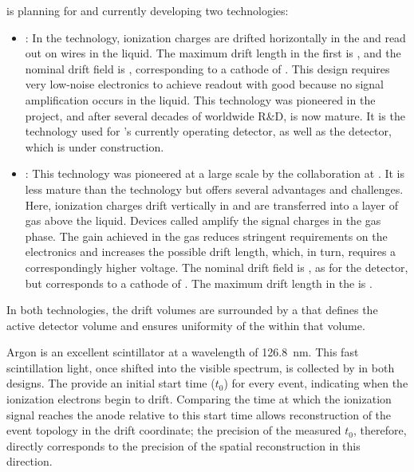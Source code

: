  is planning for and currently developing two  technologies:
\begin{itemize}
\item {}: In the  technology, ionization charges are drifted horizontally in the  and read out on wires in the liquid.  The maximum drift length in the first   is \spmaxdrift, and the nominal drift field is \spmaxfield, corresponding to a cathode  of \sptargetdriftvoltpos. This design requires very low-noise electronics to achieve readout with good  because no signal amplification occurs in the liquid. This technology was pioneered in the  project, and after several decades of worldwide R\&D, is now mature. It is the technology used for 's currently operating  detector, as well as the  detector, which is under construction. 

\item {}: This technology was pioneered at a large scale by the  collaboration at . It is less mature than the  technology but offers several advantages and challenges. Here, ionization charges drift vertically in  and are transferred into a layer of gas above the liquid. Devices called  amplify the signal charges  in the gas phase. The gain achieved in the gas reduces stringent requirements on the electronics and increases the possible drift length, which, in turn, requires a correspondingly higher voltage. The nominal drift field is \dpnominaldriftfield, as for the  detector, but corresponds to a cathode  of \dptargetdriftvoltpos.
The maximum drift length in the  is \dpmaxdrift{}.  
\end{itemize}
In both technologies, the drift volumes are surrounded by a  that defines the active detector volume and ensures uniformity of the \efield within that volume.

Argon is an excellent scintillator at a wavelength of \SI{126.8}{\nano\meter}. This fast scintillation light, once shifted into the visible spectrum, is collected by  in both designs. The  provide an initial start time ($t_{0}$) for every event, indicating when the ionization electrons begin to drift. Comparing the time at which the ionization signal reaches the anode relative to this start time allows reconstruction of the event topology in the drift coordinate; the precision of the measured $t_{0}$, therefore, directly corresponds to the precision of the spatial reconstruction in this direction. 

